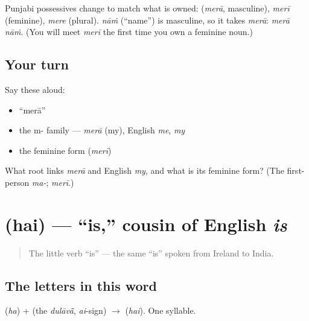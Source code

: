 \begin{grammarlens}[title={Grammar Lens: \textquotedblleft{}my\textquotedblright{} agrees with the noun}]
Punjabi possessives change to match what is owned: \textbf{} (\emph{merā}, masculine), \emph{merī} (feminine), \emph{mere} (plural). \emph{nāṁ} (\textquotedblleft{}name\textquotedblright{}) is masculine, so it takes \emph{merā}: \emph{merā nāṁ}. (You will meet \emph{merī} the first time you own a feminine noun.)
\end{grammarlens}

\subsection*{Your turn}
Say these aloud:

\begin{itemize}
\raggedright
  \item \textquotedblleft{}merā\textquotedblright{}
  \item the m- family — \emph{merā} (my), English \emph{me}, \emph{my}
  \item the feminine form (\emph{merī})
\end{itemize}

\begin{tcolorbox}[breakable,colback=teal!4,colframe=teal!35!black,title={Before you move on}]
What root links \emph{merā} and English \emph{my}, and what is its feminine form? (The first-person \emph{ma-}; \emph{merī}.)
\end{tcolorbox}
\section[\texorpdfstring{\pa{ਹੈ} (hai)}{ਹੈ (hai)}]{ (hai) — \textquotedblleft{}is,\textquotedblright{} cousin of English \emph{is}}

\label{lesson:PA-C02-hai}



\begin{quote}
The little verb \textquotedblleft{}is\textquotedblright{} — the same \textquotedblleft{}is\textquotedblright{} spoken from Ireland to India.
\end{quote}

\subsection*{The letters in this word}
\textbf{} (\emph{ha}) + \textbf{} (the \emph{dulāvā̃}, \emph{ai}-sign) $\to$ \textbf{} (\emph{hai}). One syllable.

